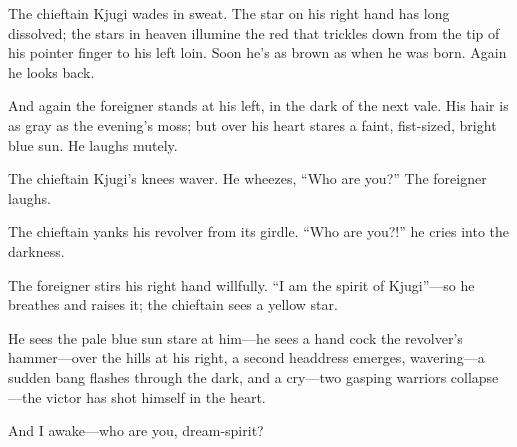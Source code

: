 \documentclass[12pt,a4paper]{article}
\begin{document}
The chieftain Kjugi wades in sweat. The star on his right hand has long dissolved; the stars in heaven illumine the red that trickles down from the tip of his pointer finger to his left loin. Soon he’s as brown as when he was born. Again he looks back.

And again the foreigner stands at his left, in the dark of the next vale. His hair is as gray as the evening’s moss; but over his heart stares a faint, fist-sized, bright blue sun. He laughs mutely.

The chieftain Kjugi’s knees waver. He wheezes, “Who are you?” The foreigner laughs.

The chieftain yanks his revolver from its girdle. “Who are you?!” he cries into the darkness.

The foreigner stirs his right hand willfully. “I am the spirit of Kjugi”—so he breathes and raises it; the chieftain sees a yellow star.

He sees the pale blue sun stare at him—he sees a hand cock the revolver’s hammer—over the hills at his right, a second headdress emerges, wavering—a sudden bang flashes through the dark, and a cry—two gasping warriors collapse—the victor has shot himself in the heart.

And I awake—who are you, dream-spirit?
\end{document}
